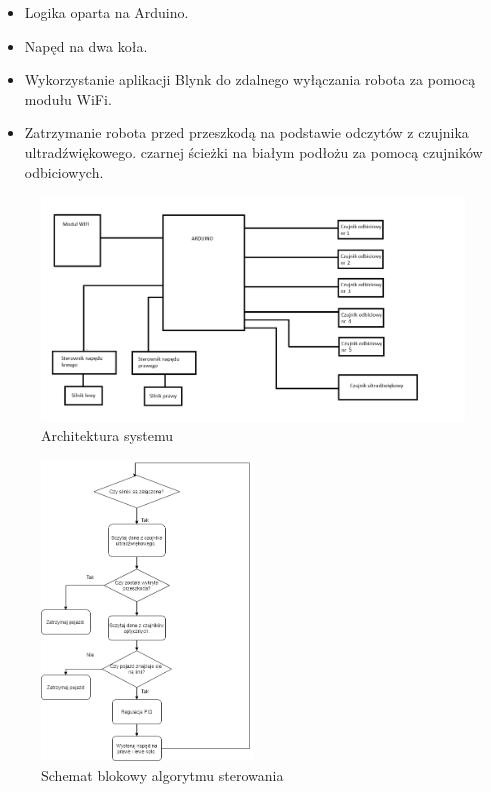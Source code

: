 \documentclass[10pt, a4paper]{article}
\begin{document}
\begin{itemize}
    \item Logika oparta na Arduino.
    \item Napęd na dwa koła.
    \item Wykorzystanie aplikacji Blynk do zdalnego wyłączania robota za pomocą modułu WiFi.
    \item Zatrzymanie robota przed przeszkodą na podstawie odczytów z czujnika ultradźwiękowego.
     czarnej ścieżki na białym podłożu za pomocą czujników odbiciowych.
\end{itemize}
\newpage
\begin{figure}[H]
	\centering
	\includegraphics[width=\textwidth]{Architektura.png}
	\caption{Architektura systemu}
	\label{fig:Architektura}
\end{figure}

\begin{figure}[H]
	\centering
	\includegraphics[width=0.5\textwidth]{Linefollower.png}
	\caption{Schemat blokowy algorytmu sterowania}
	\label{fig:schematBlokowy}
\end{figure}
\newpage
\end{document}
